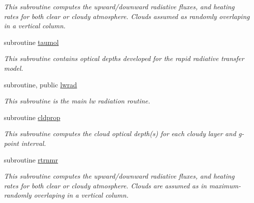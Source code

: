 \begin{DoxyCompactItemize}
\begin{DoxyCompactList}\small\item\em This subroutine computes the upward/downward radiative fluxes, and heating rates for both clear or cloudy atmosphere. Clouds assumed as randomly overlaping in a vertical column. \end{DoxyCompactList}\item 
subroutine \hyperlink{namespacemodule__radlw__main_a7025e0f49149cf0ddbdd175efb5fe986}{taumol}                                                                                               
\begin{DoxyCompactList}\small\item\em This subroutine contains optical depths developed for the rapid radiative transfer model. \end{DoxyCompactList}\end{DoxyCompactItemize}
{\bf }\par
\begin{DoxyCompactItemize}
\item 
subroutine, public \hyperlink{namespacemodule__radlw__main_a072a355f2067d729d64d2997270e36b1}{lwrad}                                                                                                 
\begin{DoxyCompactList}\small\item\em This subroutine is the main lw radiation routine. \end{DoxyCompactList}\end{DoxyCompactItemize}

{\bf }\par
\begin{DoxyCompactItemize}
\item 
subroutine \hyperlink{namespacemodule__radlw__main_a8fb170c933c1644e03d8aaba2451ee0f}{cldprop}                                                                                             
\begin{DoxyCompactList}\small\item\em This subroutine computes the cloud optical depth(s) for each cloudy layer and g-\/point interval. \end{DoxyCompactList}\end{DoxyCompactItemize}

{\bf }\par
\begin{DoxyCompactItemize}
\item 
subroutine \hyperlink{namespacemodule__radlw__main_ad8f07b8a0e3dfa639b970d756824b9d3}{rtrnmr}                                                                                               
\begin{DoxyCompactList}\small\item\em This subroutine computes the upward/downward radiative fluxes, and heating rates for both clear or cloudy atmosphere. Clouds are assumed as in maximum-\/randomly overlaping in a vertical column. \end{DoxyCompactList}\end{DoxyCompactItemize}

